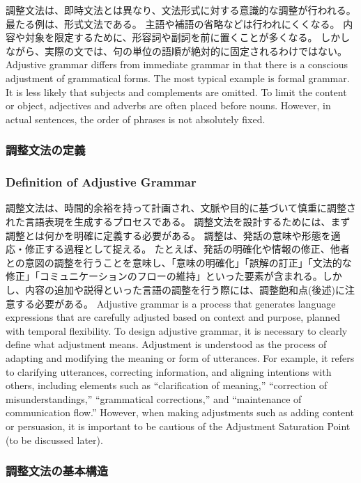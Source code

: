 \documentclass[a4paper]{article}
\begin{document}
\ifJPN
調整文法は、即時文法とは異なり、文法形式に対する意識的な調整が行われる。
最たる例は、形式文法である。
主語や補語の省略などは行われにくくなる。
内容や対象を限定するために、形容詞や副詞を前に置くことが多くなる。
しかしながら、実際の文では、句の単位の語順が絶対的に固定されるわけではない。
\else
Adjustive grammar differs from immediate grammar in that there is a conscious adjustment of grammatical forms.
The most typical example is formal grammar.
It is less likely that subjects and complements are omitted.
To limit the content or object, adjectives and adverbs are often placed before nouns.
However, in actual sentences, the order of phrases is not absolutely fixed.
\fi

\ifJPN
\subsubsection{調整文法の定義}
\else
\subsubsection{Definition of Adjustive Grammar}
\fi

\ifJPN
調整文法は、時間的余裕を持って計画され、文脈や目的に基づいて慎重に調整された言語表現を生成するプロセスである。
調整文法を設計するためには、まず調整とは何かを明確に定義する必要がある。
調整は、発話の意味や形態を適応・修正する過程として捉える。
たとえば、発話の明確化や情報の修正、他者との意図の調整を行うことを意味し、「意味の明確化」「誤解の訂正」「文法的な修正」「コミュニケーションのフローの維持」といった要素が含まれる。しかし、内容の追加や説得といった言語の調整を行う際には、調整飽和点(後述)に注意する必要がある。
\else
Adjustive grammar is a process that generates language expressions that are carefully adjusted based on context and purpose, planned with temporal flexibility.
To design adjustive grammar, it is necessary to clearly define what adjustment means.
Adjustment is understood as the process of adapting and modifying the meaning or form of utterances.
For example, it refers to clarifying utterances, correcting information, and aligning intentions with others, including elements such as ``clarification of meaning,'' ``correction of misunderstandings,'' ``grammatical corrections,'' and ``maintenance of communication flow.'' However, when making adjustments such as adding content or persuasion, it is important to be cautious of the Adjustment Saturation Point (to be discussed later).
\fi

\ifJPN
\subsubsection{調整文法の基本構造}
\else
\end{document}
